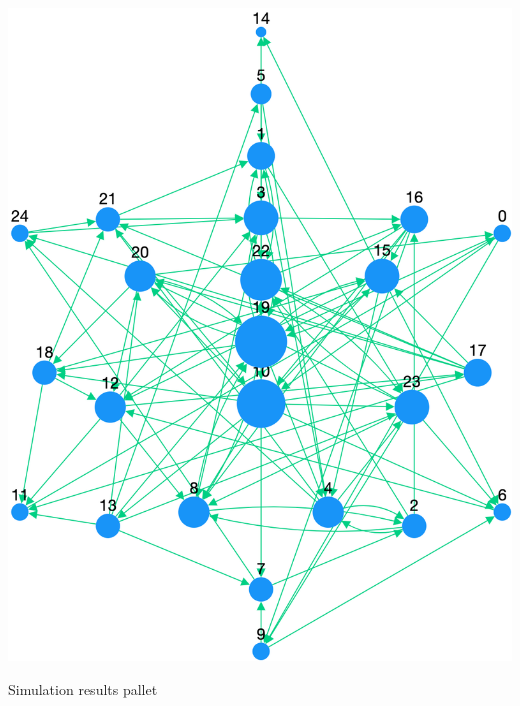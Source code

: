 \documentclass[landscape,paperwidth=70in,paperheight=46in,fontscale=0.225]{baposter} %
\begin{document}
\begin{poster}
{\begin{minipage}{0.3\linewidth}
\includegraphics[scale=0.08]{figures/gnm-25-100_pngraph.png} 
\end{minipage}



\vspace{0.3in}


\begin{minipage}{0.3\linewidth}
Simulation results pallet


\end{minipage}}
\end{poster}
\end{document}
